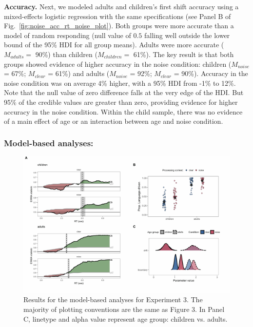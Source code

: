 \documentclass[english,floatsintext,man]{apa6}
\begin{document}
\textbf{Accuracy.} Next, we modeled adults and children's first shift
accuracy using a mixed-effects logistic regression with the same
specifications (see Panel B of Fig.~\ref{fig:noise_acc_rt_noise_plot}).
Both groups were more accurate than a model of random responding (null
value of \(0.5\) falling well outside the lower bound of the 95\% HDI
for all group means). Adults were more accurate (\(M_{adults} =\) 90\%)
than children (\(M_{children} =\) 61\%). The key result is that both
groups showed evidence of higher accuracy in the noise condition:
children (\(M_{noise}\) = 67\%; \(M_{clear}\) = 61\%) and adults
(\(M_{noise}\) = 92\%; \(M_{clear}\) = 90\%). Accuracy in the noise
condition was on average 4\% higher, with a 95\% HDI from -1\% to 12\%.
Note that the null value of zero difference falls at the very edge of
the HDI. But 95\% of the credible values are greater than zero,
providing evidence for higher accuracy in the noise condition. Within
the child sample, there was no evidence of a main effect of age or an
interaction between age and noise condition.

\hypertarget{model-based-analyses-2}{%
\subsubsection{Model-based analyses:}\label{model-based-analyses-2}}

\begin{figure}[!ht]

{\centering \includegraphics[width=0.9\linewidth]{figs/noise-model-plots-1} 

}

\caption{Results for the model-based analyses for Experiment 3. The majority of plotting conventions are the same as Figure 3. In Panel C, linetype and alpha value represent age group: children vs. adults.}\label{fig:noise-model-plots}
\end{figure}
\end{document}
